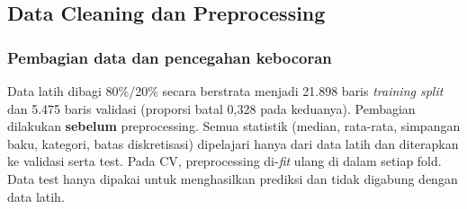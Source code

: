 \documentclass[12pt,a4paper]{article}
\begin{document}
\subsection{Data Cleaning dan Preprocessing}
\subsubsection{Pembagian data dan pencegahan kebocoran}
Data latih dibagi 80\%/20\% secara berstrata menjadi 21.898 baris \textit{training split} dan 5.475 baris validasi (proporsi batal 0,328 pada keduanya). Pembagian dilakukan \textbf{sebelum} preprocessing. Semua statistik (median, rata-rata, simpangan baku, kategori, batas diskretisasi) dipelajari hanya dari data latih dan diterapkan ke validasi serta test. Pada CV, preprocessing di-\textit{fit} ulang di dalam setiap fold. Data test hanya dipakai untuk menghasilkan prediksi dan tidak digabung dengan data latih.
\end{document}
